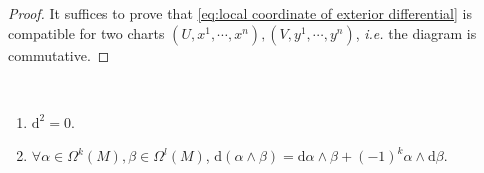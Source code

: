 \begin{proof}
    It suffices to prove that \eqref{eq:local coordinate of exterior differential} is compatible for two charts  $ (U,x^1,\cdots,x^n),(V,y^1,\cdots,y^n) $, \textit{i.e.} the diagram is commutative.
    {
    \footnotesize
    }
\end{proof}
\begin{theorem}
    \,
    \begin{enumerate}[label=(\arabic*)]
        \item $ \mathrm{d}^2=0 $.
        \item  $ \forall \alpha\in \Omega^k(M),\beta\in \Omega^l(M) $,  $ \mathrm{d}(\alpha\wedge\beta)=\mathrm{d}\alpha\wedge\beta+(-1)^{k}\alpha\wedge\mathrm{d}\beta $.
    \end{enumerate}
\end{theorem}
